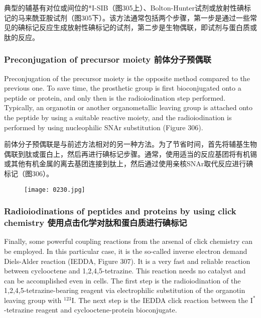 \documentclass[dvipsnames, svgnames,a4paper,11pt]{article}
\begin{document}
典型的辅基有对位或间位的*I-SIB（图305上）、Bolton-Hunter试剂或放射性碘标记的马来酰亚胺试剂（图305下）。该方法通常包括两个步骤，第一步是通过一些常见的碘标记反应生成放射性碘标记的试剂，第二步是生物偶联，即试剂与蛋白质或肽的反应。  

\subsubsection{Preconjugation of precursor moiety 前体分子预偶联}  
Preconjugation of the precursor moiety is the opposite method compared to the previous one. To save time, the prosthetic group is first bioconjugated onto a peptide or protein, and only then is the radioiodination step performed. Typically, an organotin or another organometallic leaving group is attached onto the peptide by using a suitable reactive moiety, and the radioiodination is performed by using nucleophilic SNAr substitution (Figure 306).  

前体分子预偶联是与前述方法相对的另一种方法。为了节省时间，首先将辅基生物偶联到肽或蛋白上，然后再进行碘标记步骤。通常，使用适当的反应基团将有机锡或其他有机金属的离去基团连接到肽上，然后通过使用亲核SNAr取代反应进行碘标记（图306）。  

\begin{figure}[h]
	\centering
    \texttt{[image: 0230.jpg]}  
     \label{fig306}
\end{figure}


\subsubsection{Radioiodinations of peptides and proteins by using click chemistry 使用点击化学对肽和蛋白质进行碘标记}  
Finally, some powerful coupling reactions from the arsenal of click chemistry can be employed. In this particular case, it is the so-called inverse electron demand Diels-Alder reaction (IEDDA, Figure 307). It is a very fast and reliable reaction between cyclooctene and 1,2,4,5-tetrazine. This reaction needs no catalyst and can be accomplished even in cells. The first step is the radioiodination of the 1,2,4,5-tetrazine-bearing reagent via electrophilic substitution of the organotin leaving group with \(\mathrm{^{123}I}\). The next step is the IEDDA click reaction between the \(\mathrm{I^{*}}\)-tetrazine reagent and cyclooctene-protein bioconjugate.
\end{document}
